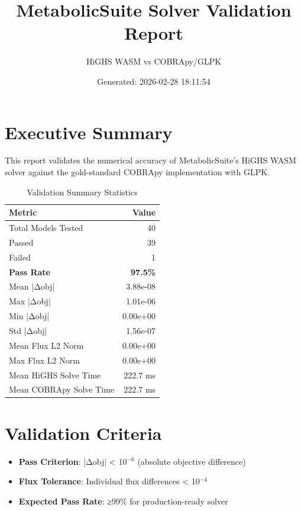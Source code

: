 \documentclass{article}
\title{MetabolicSuite Solver Validation Report}
\author{HiGHS WASM vs COBRApy/GLPK}
\date{Generated: 2026-02-28 18:11:54}
\begin{document}
\maketitle

\section{Executive Summary}

This report validates the numerical accuracy of MetabolicSuite's HiGHS WASM solver
against the gold-standard COBRApy implementation with GLPK.

\begin{table}[h]
\centering
\caption{Validation Summary Statistics}
\label{tab:summary}
\begin{tabular}{lr}
\toprule
\textbf{Metric} & \textbf{Value} \\
\midrule
Total Models Tested & 40 \\
Passed & 39 \\
Failed & 1 \\
\textbf{Pass Rate} & \textbf{97.5\%} \\
\midrule
Mean |Δobj| & 3.88e-08 \\
Max |Δobj| & 1.01e-06 \\
Min |Δobj| & 0.00e+00 \\
Std |Δobj| & 1.56e-07 \\
\midrule
Mean Flux L2 Norm & 0.00e+00 \\
Max Flux L2 Norm & 0.00e+00 \\
\midrule
Mean HiGHS Solve Time & 222.7 ms \\
Mean COBRApy Solve Time & 222.7 ms \\
\bottomrule
\end{tabular}
\end{table}

\section{Validation Criteria}

\begin{itemize}
    \item \textbf{Pass Criterion}: |Δobj| < 10$^{-6}$ (absolute objective difference)
    \item \textbf{Flux Tolerance}: Individual flux differences < 10$^{-4}$
    \item \textbf{Expected Pass Rate}: ≥99\% for production-ready solver
\end{itemize}
\end{document}
